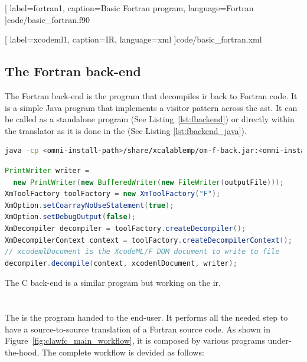 
  [
    label=fortran1,
    caption=Basic Fortran program,
    language=Fortran
  ]{code/basic_fortran.f90}


  [
    label=xcodeml1,
    caption=\xcodemlf IR,
    language=xml
  ]{code/basic_fortran.xml}

\subsection{The Fortran back-end}
The Fortran back-end is the program that decompiles \gls{ir} back to Fortran
code. It is a simple Java program that implements a visitor pattern across
the \gls{ast}. It can be called as a standalone program 
(See Listing~\ref{lst:fbackend}) or directly within the translator as it is 
done in the \clawfcomp (See Listing \ref{lst:fbackend_java}).

\begin{lstlisting}[label=lst:fbackend, language=Bash, caption=Execute the 
  Fortran back-end as a standalone]
java -cp <omni-install-path>/share/xcalablemp/om-f-back.jar:<omni-install-path>/share/xcalablemp/om-exc-tools.jar xcodeml.f.util.omx2f -l xcodeml.xml
\end{lstlisting}

\begin{lstlisting}[label=lst:fbackend_java, language=Java, 
  caption=Fortran back-end called from Java]
PrintWriter writer = 
  new PrintWriter(new BufferedWriter(new FileWriter(outputFile)));
XmToolFactory toolFactory = new XmToolFactory("F");
XmOption.setCoarrayNoUseStatement(true);
XmOption.setDebugOutput(false);
XmDecompiler decompiler = toolFactory.createDecompiler();
XmDecompilerContext context = toolFactory.createDecompilerContext();
// xcodemlDocument is the XcodeML/F DOM document to write to file
decompiler.decompile(context, xcodemlDocument, writer); 
\end{lstlisting}

The C back-end is a similar program but working on the \xcodemlc{} \gls{ir}.

\section{\clawfcomp}
The \clawfc is the program handed to the end-user. It performs all the needed
step to have a source-to-source translation of a Fortran source code. 
As shown in Figure~\ref{fig:clawfc_main_workflow}, 
it is composed by various programs under-the-hood. 
The complete workflow is devided as follows:

